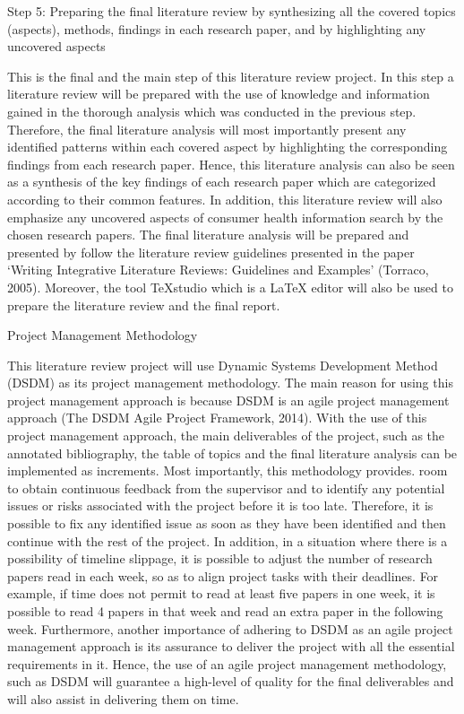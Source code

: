 \documentclass[]{article}
\begin{document}
Step 5: Preparing the final literature review by synthesizing all the covered topics (aspects), methods, findings in each research paper, and by highlighting any uncovered aspects

This is the final and the main step of this literature review project. In this step a literature review will be prepared with the use of knowledge and information gained in the thorough analysis which was conducted in the previous step. Therefore, the final literature analysis will most importantly present any identified patterns within each covered aspect by highlighting the corresponding findings from each research paper. Hence, this literature analysis can also be seen as a synthesis of the key findings of each research paper which are categorized according to their common features. In addition, this literature review will also emphasize any uncovered aspects of consumer health information search by the chosen research papers. The final literature analysis will be prepared and presented by follow the literature review guidelines presented in the paper ‘Writing Integrative Literature Reviews: Guidelines and Examples’ (Torraco, 2005). Moreover, the tool TeXstudio which is a LaTeX editor will also be used to prepare the literature review and the final report.

Project Management Methodology 

This literature review project will use Dynamic Systems Development Method (DSDM) as its project management methodology. The main reason for using this project management approach is because DSDM is an agile project management approach (The DSDM Agile Project Framework, 2014). With the use of this project management approach, the main deliverables of the project, such as the annotated bibliography, the table of topics and the final literature analysis can be implemented as increments. Most importantly, this methodology provides. room to obtain continuous feedback from the supervisor and to identify any potential issues or risks associated with the project before it is too late. Therefore, it is possible to fix any identified issue as soon as they have been identified and then continue with the rest of the project. In addition, in a situation where there is a possibility of timeline slippage, it is possible to adjust the number of research papers read in each week, so as to align project tasks with their deadlines. For example, if time does not permit to read at least five papers in one week, it is possible to read 4 papers in that week and read an extra paper in the following week. Furthermore, another importance of adhering to DSDM as an agile project management approach is its assurance to deliver the project with all the essential requirements in it. Hence, the use of an agile project management methodology, such as DSDM will guarantee a high-level of quality for the final deliverables and will also assist in delivering them on time. 




  
\end{document}
